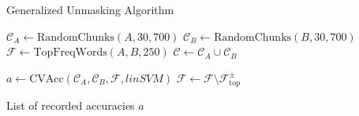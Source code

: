 \begin{algorithm}
    \caption{Generalized Unmasking Algorithm \citep{bevendorff_generalizing_2019,bevendorff_divergence_based_2020}}
    \label{alg:generalized_unmasking}
    \begin{algorithmic}[1]
    
        \State $\mathcal{C}_A \gets \text{RandomChunks}(A, 30, 700)$ 
        \State $\mathcal{C}_B \gets \text{RandomChunks}(B, 30, 700)$
        \State $\mathcal{F} \gets \text{TopFreqWords}(A, B, 250)$
        \State $\mathcal{C} \gets \mathcal{C}_A \cup \mathcal{C}_B$

        
        \State $a \gets \text{CVAcc}(\mathcal{C}_A, \mathcal{C}_B, \mathcal{F}, linSVM)$ 
        \State $\mathcal{F} \gets \mathcal{F} \setminus \mathcal{F}_{\text{top}}^{\pm}$ 
    
        \EndWhile
    
        \State \Return List of recorded accuracies $a$
    \EndProcedure
    \end{algorithmic}
\end{algorithm}


